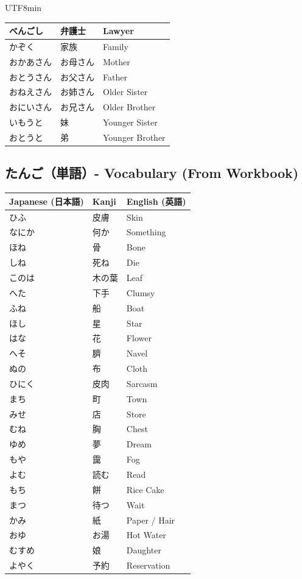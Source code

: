 \documentclass[11pt]{article}
\begin{document}
\begin{CJK}{UTF8}{min}
\begin{tabularx}{\linewidth}{X | X | X}
    べんごし & 弁護士 & Lawyer \\
    \hline
    かぞく & 家族 & Family \\
    おかあさん & お母さん & Mother \\
    おとうさん & お父さん & Father \\
    おねえさん & お姉さん & Older Sister \\
    おにいさん & お兄さん & Older Brother \\
    いもうと & 妹 & Younger Sister \\
    おとうと & 弟 & Younger Brother \\
    \bottomrule
\end{tabularx}

\newpage
\subsection{たんご（単語）- Vocabulary (From Workbook)}
\begin{tabularx}{\linewidth}{X | X | X}
    \toprule
    \textbf{Japanese (日本語)} & \textbf{Kanji} & \textbf{English (英語)} \\
    \midrule
    ひふ & 皮膚 & Skin \\
    なにか & 何か & Something \\
    ほね & 骨 & Bone \\
    しね & 死ね & Die \\
    このは & 木の葉 & Leaf \\
    へた & 下手 & Clumsy \\
    ふね & 船 & Boat \\
    ほし & 星 & Star \\
    はな & 花 & Flower \\
    へそ & 臍 & Navel \\
    ぬの & 布 & Cloth \\
    ひにく & 皮肉 & Sarcasm \\
    まち & 町 & Town \\
    みせ & 店 & Store \\
    むね & 胸 & Chest \\
    ゆめ & 夢 & Dream \\
    もや & 靄 & Fog \\
    よむ & 読む & Read \\
    もち & 餅 & Rice Cake \\
    まつ & 待つ & Wait \\
    かみ & 紙 & Paper / Hair \\
    おゆ & お湯 & Hot Water \\
    むすめ & 娘 & Daughter \\
    よやく & 予約 & Reservation \\
    \bottomrule
\end{tabularx}


\end{CJK}
\end{document}
